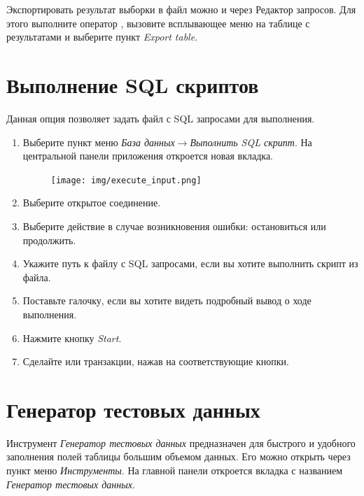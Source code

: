 \begin{redremark}
	Экспортировать результат выборки в файл можно и через Редактор запросов. Для этого выполните оператор , вызовите всплывающее меню на таблице с результатами и выберите пункт \textit{Export table}.
\end{redremark} 

\newpage

\section{Выполнение SQL скриптов}\label{sec:execute_scripts}

Данная опция позволяет задать файл с SQL запросами для выполнения.

\begin{enumerate}[leftmargin=39pt]
	\item Выберите пункт меню \textit{База данных}$\rightarrow$\textit{Выполнить SQL скрипт}. На центральной панели приложения откроется новая вкладка.
	\begin{figure}[H]
		\flushright
		\texttt{[image: img/execute\_input.png]}
	\end{figure}
	\item Выберите открытое соединение.
	\item Выберите действие в случае возникновения ошибки: остановиться или продолжить.
	\item Укажите путь к файлу с SQL запросами, если вы хотите выполнить скрипт из файла.
	\item Поставьте галочку, если вы хотите видеть подробный вывод о ходе выполнения.
	\item Нажмите кнопку \textit{Start}.
	\item Сделайте  или  транзакции, нажав на соответствующие кнопки.
\end{enumerate}


\newpage

\section{Генератор тестовых данных}\label{sec:test_data_generator}

Инструмент \textit{Генератор тестовых данных} предназначен для быстрого и удобного заполнения полей таблицы большим объемом данных. Его можно открыть через пункт меню \textit{Инструменты}.
На главной панели откроется вкладка с названием \textit{Генератор тестовых данных}. 


